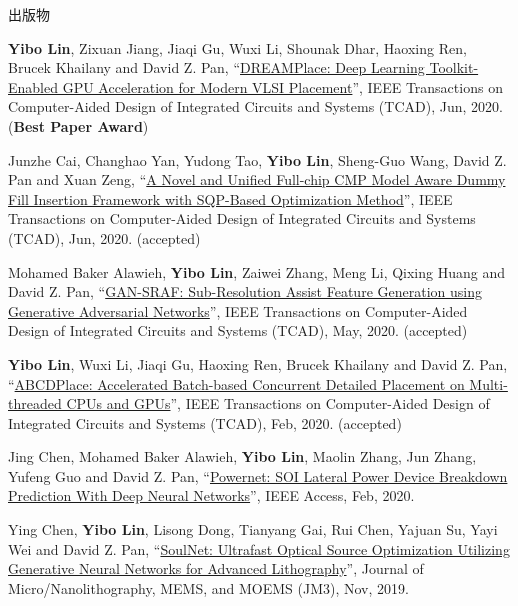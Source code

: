 \begin{rSection}{出版物}
\begin{description}[font=\normalfont]
{}
            

\item[{[J21]}]{
        \textbf{Yibo Lin}, Zixuan Jiang, Jiaqi Gu, Wuxi Li, Shounak Dhar, Haoxing Ren, Brucek Khailany and David Z. Pan, 
    ``\href{https://doi.org/10.1109/TCAD.2020.3003843}{DREAMPlace: Deep Learning Toolkit-Enabled GPU Acceleration for Modern VLSI Placement}'', 
    IEEE Transactions on Computer-Aided Design of Integrated Circuits and Systems (TCAD), Jun, 2020.
    (\textbf{Best Paper Award})
}
            

\item[{[J20]}]{
        Junzhe Cai, Changhao Yan, Yudong Tao, \textbf{Yibo Lin}, Sheng-Guo Wang, David Z. Pan and Xuan Zeng, 
    ``\href{https://doi.org/10.1109/TCAD.2020.3001380}{A Novel and Unified Full-chip CMP Model Aware Dummy Fill Insertion Framework with SQP-Based Optimization Method}'', 
    IEEE Transactions on Computer-Aided Design of Integrated Circuits and Systems (TCAD), Jun, 2020.
    (accepted)
}
            

\item[{[J19]}]{
        Mohamed Baker Alawieh, \textbf{Yibo Lin}, Zaiwei Zhang, Meng Li, Qixing Huang and David Z. Pan, 
    ``\href{https://doi.org/10.1109/TCAD.2020.2995338}{GAN-SRAF: Sub-Resolution Assist Feature Generation using Generative Adversarial Networks}'', 
    IEEE Transactions on Computer-Aided Design of Integrated Circuits and Systems (TCAD), May, 2020.
    (accepted)
}
            

\item[{[J18]}]{
        \textbf{Yibo Lin}, Wuxi Li, Jiaqi Gu, Haoxing Ren, Brucek Khailany and David Z. Pan, 
    ``\href{https://doi.org/10.1109/TCAD.2020.2971531}{ABCDPlace: Accelerated Batch-based Concurrent Detailed Placement on Multi-threaded CPUs and GPUs}'', 
    IEEE Transactions on Computer-Aided Design of Integrated Circuits and Systems (TCAD), Feb, 2020.
    (accepted)
}
            

\item[{[J17]}]{
        Jing Chen, Mohamed Baker Alawieh, \textbf{Yibo Lin}, Maolin Zhang, Jun Zhang, Yufeng Guo and David Z. Pan, 
    ``\href{https://doi.org/10.1109/ACCESS.2020.2970966}{Powernet: SOI Lateral Power Device Breakdown Prediction With Deep Neural Networks}'', 
    IEEE Access, Feb, 2020.
    
}
            

\item[{[J16]}]{
        Ying Chen, \textbf{Yibo Lin}, Lisong Dong, Tianyang Gai, Rui Chen, Yajuan Su, Yayi Wei and David Z. Pan, 
    ``\href{https://dx.doi.org/10.1117/1.JMM.18.4.043506}{SoulNet: Ultrafast Optical Source Optimization Utilizing Generative Neural Networks for Advanced Lithography}'', 
    Journal of Micro/Nanolithography, MEMS, and MOEMS (JM3), Nov, 2019.
    
}
\end{description}
\end{rSection}
